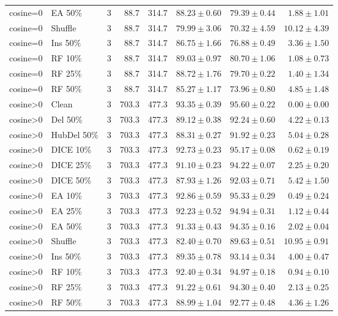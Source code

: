 {\begin{longtable}{llrrrrrr}
cosine=0 & EA 50\% & 3 & 88.7 & 314.7 & $88.23\pm0.60$ & $79.39\pm0.44$ & $1.88\pm1.01$ \\
cosine=0 & Shuffle & 3 & 88.7 & 314.7 & $79.99\pm3.06$ & $70.32\pm4.59$ & $10.12\pm4.39$ \\
cosine=0 & Ins 50\% & 3 & 88.7 & 314.7 & $86.75\pm1.66$ & $76.88\pm0.49$ & $3.36\pm1.50$ \\
cosine=0 & RF 10\% & 3 & 88.7 & 314.7 & $89.03\pm0.97$ & $80.70\pm1.06$ & $1.08\pm0.73$ \\
cosine=0 & RF 25\% & 3 & 88.7 & 314.7 & $88.72\pm1.76$ & $79.70\pm0.22$ & $1.40\pm1.34$ \\
cosine=0 & RF 50\% & 3 & 88.7 & 314.7 & $85.27\pm1.17$ & $73.96\pm0.80$ & $4.85\pm1.48$ \\
cosine>0 & Clean & 3 & 703.3 & 477.3 & $93.35\pm0.39$ & $95.60\pm0.22$ & $0.00\pm0.00$ \\
cosine>0 & Del 50\% & 3 & 703.3 & 477.3 & $89.12\pm0.38$ & $92.24\pm0.60$ & $4.22\pm0.13$ \\
cosine>0 & HubDel 50\% & 3 & 703.3 & 477.3 & $88.31\pm0.27$ & $91.92\pm0.23$ & $5.04\pm0.28$ \\
cosine>0 & DICE 10\% & 3 & 703.3 & 477.3 & $92.73\pm0.23$ & $95.17\pm0.08$ & $0.62\pm0.19$ \\
cosine>0 & DICE 25\% & 3 & 703.3 & 477.3 & $91.10\pm0.23$ & $94.22\pm0.07$ & $2.25\pm0.20$ \\
cosine>0 & DICE 50\% & 3 & 703.3 & 477.3 & $87.93\pm1.26$ & $92.03\pm0.71$ & $5.42\pm1.50$ \\
cosine>0 & EA 10\% & 3 & 703.3 & 477.3 & $92.86\pm0.59$ & $95.33\pm0.29$ & $0.49\pm0.24$ \\
cosine>0 & EA 25\% & 3 & 703.3 & 477.3 & $92.23\pm0.52$ & $94.94\pm0.31$ & $1.12\pm0.44$ \\
cosine>0 & EA 50\% & 3 & 703.3 & 477.3 & $91.33\pm0.43$ & $94.35\pm0.16$ & $2.02\pm0.04$ \\
cosine>0 & Shuffle & 3 & 703.3 & 477.3 & $82.40\pm0.70$ & $89.63\pm0.51$ & $10.95\pm0.91$ \\
cosine>0 & Ins 50\% & 3 & 703.3 & 477.3 & $89.35\pm0.78$ & $93.14\pm0.34$ & $4.00\pm0.47$ \\
cosine>0 & RF 10\% & 3 & 703.3 & 477.3 & $92.40\pm0.34$ & $94.97\pm0.18$ & $0.94\pm0.10$ \\
cosine>0 & RF 25\% & 3 & 703.3 & 477.3 & $91.22\pm0.61$ & $94.30\pm0.40$ & $2.13\pm0.25$ \\
cosine>0 & RF 50\% & 3 & 703.3 & 477.3 & $88.99\pm1.04$ & $92.77\pm0.48$ & $4.36\pm1.26$ \\

\end{longtable}}
